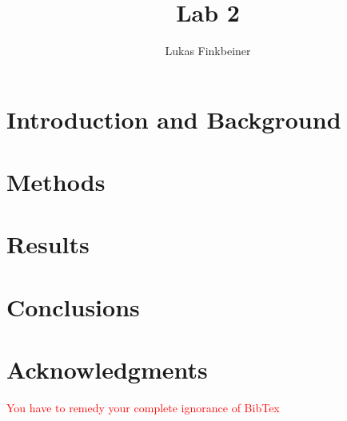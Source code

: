 \documentclass[a4paper]{article}
\title{Lab 2}
\author{Lukas Finkbeiner}
\begin{document}
\maketitle

\begin{abstract}


\end{abstract}


\section{Introduction and Background}

\section{Methods}

\section{Results}

\section{Conclusions}

\section{Acknowledgments}

\textcolor{red}{You have to remedy your complete ignorance of BibTex}
\end{document}
